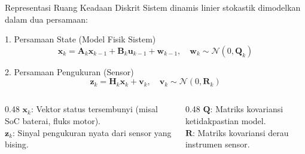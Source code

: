 \documentclass[aspectratio=169, 10pt]{beamer}
\begin{document}
\begin{frame}{Representasi Ruang Keadaan Diskrit}
    Sistem dinamis linier stokastik dimodelkan dalam dua persamaan:
    \begin{block}{1. Persamaan State (Model Fisik Sistem)}
        \begin{equation}
            \mathbf{x}_k = \mathbf{A}_k \mathbf{x}_{k-1} + \mathbf{B}_k \mathbf{u}_{k-1} + \mathbf{w}_{k-1}, \quad \mathbf{w}_k \sim \mathcal{N}(0, \mathbf{Q}_k)
        \end{equation}
    \end{block}
    \begin{block}{2. Persamaan Pengukuran (Sensor)}
        \begin{equation}
            \mathbf{z}_k = \mathbf{H}_k \mathbf{x}_k + \mathbf{v}_k, \quad \mathbf{v}_k \sim \mathcal{N}(0, \mathbf{R}_k)
        \end{equation}
    \end{block}
    \begin{columns}[T]
        \begin{column}{0.48\textwidth}
            $\mathbf{x}_k$: Vektor status tersembunyi (misal SoC baterai, fluks motor).\\
            $\mathbf{z}_k$: Sinyal pengukuran nyata dari sensor yang bising.
        \end{column}
        \begin{column}{0.48\textwidth}
            $\mathbf{Q}$: Matriks kovariansi ketidakpastian model.\\
            $\mathbf{R}$: Matriks kovariansi derau instrumen sensor.
        \end{column}
    \end{columns}
\end{frame}
\end{document}
